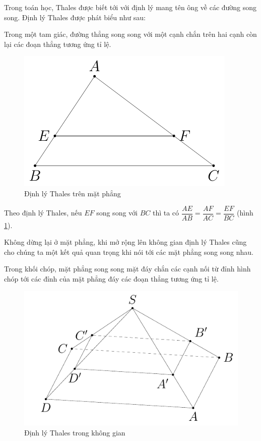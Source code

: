 Trong toán học, Thales được biết tới với định lý mang tên ông về các đường song song. Định lý Thales được phát biểu như sau:

\begin{theorem}
    Trong một tam giác, đường thẳng song song với một cạnh chắn trên hai cạnh còn lại các đoạn thẳng tương ứng tỉ lệ.
\end{theorem}

\begin{figure}[ht]
	\centering
	\includegraphics{analytic_geometry/thales1.pdf}
	\caption{Định lý Thales trên mặt phẳng}
	\label{thales1}
\end{figure}

Theo định lý Thales, nếu $EF$ song song với $BC$ thì ta có $\dfrac{AE}{AB} = \dfrac{AF}{AC} = \dfrac{EF}{BC}$ (hình \ref{thales1}).

Không dừng lại ở mặt phẳng, khi mở rộng lên không gian định lý Thales cũng cho chúng ta một kết quả quan trọng khi nói tới các mặt phẳng song song nhau.

\begin{theorem}
    Trong khối chóp, mặt phẳng song song mặt đáy chắn các cạnh nối từ đỉnh hình chóp tới các đỉnh của mặt phẳng đáy các đoạn thẳng tương ứng tỉ lệ.
\end{theorem}

\begin{figure}[ht]
	\centering
	\includegraphics{analytic_geometry/thales2.pdf}
	\caption{Định lý Thales trong không gian}
	\label{thales2}
\end{figure}

